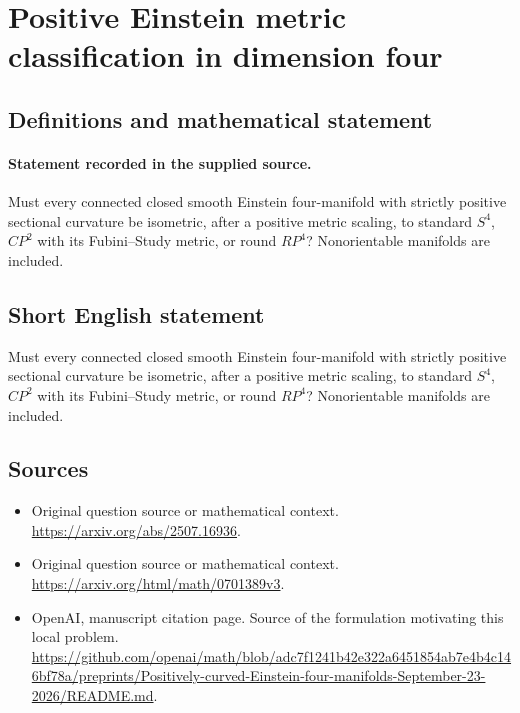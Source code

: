 \documentclass[11pt]{article}
\begin{document}
\section*{Positive Einstein metric classification in dimension four}\label{statement}
\subsection{Definitions and mathematical statement}
\paragraph{Statement recorded in the supplied source.}
Must every connected closed smooth Einstein four-manifold with strictly positive sectional curvature be isometric, after a positive metric scaling, to standard $S^{4}$, $CP^{2}$ with its Fubini–Study metric, or round $RP^{4}$? Nonorientable manifolds are included.
\subsection{Short English statement}
Must every connected closed smooth Einstein four-manifold with strictly positive sectional curvature be isometric, after a positive metric scaling, to standard $S^{4}$, $CP^{2}$ with its Fubini–Study metric, or round $RP^{4}$? Nonorientable manifolds are included.
\subsection{Sources}
\begin{itemize}
\item[S1] Original question source or mathematical context.
\url{https://arxiv.org/abs/2507.16936}.
\item[S2] Original question source or mathematical context.
\url{https://arxiv.org/html/math/0701389v3}.
\item[S3] OpenAI, manuscript citation page. Source of the formulation motivating this local problem.
\url{https://github.com/openai/math/blob/adc7f1241b42e322a6451854ab7e4b4c146bf78a/preprints/Positively-curved-Einstein-four-manifolds-September-23-2026/README.md}.
\end{itemize}
\end{document}
